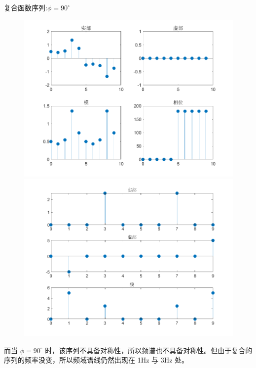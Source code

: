 \documentclass{beamer}
\begin{document}
\begin{frame}[t]{复合函数序列:$\phi = 90^\circ$}
    \begin{figure}
        \centering
        \begin{minipage}[t]{0.48\textwidth}
        \centering
        \includegraphics[width=\textwidth]{figure/复合函数序列_phi=90.png}
        \end{minipage}
        \begin{minipage}[t]{0.48\textwidth}
        \centering
        \includegraphics[width=\textwidth]{figure/频谱_复合函数序列_phi=90.png}
        \end{minipage}
    \end{figure}

    \begin{block}{}
        而当 $\phi=90^\circ$ 时，该序列不具备对称性，所以频谱也不具备对称性。但由于复合的序列的频率没变，所以频域谱线仍然出现在 1Hz 与 3Hz 处。
    \end{block}
\end{frame}
\end{document}
